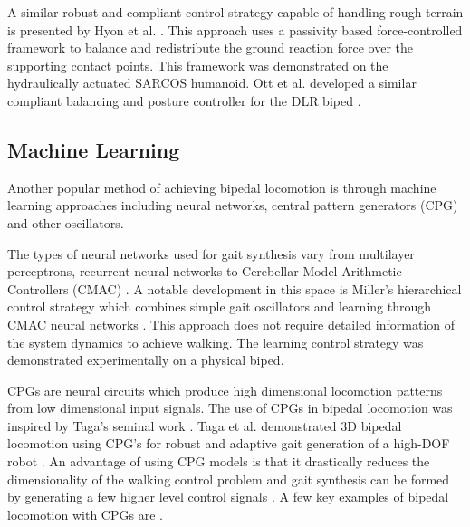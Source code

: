 A similar robust and compliant control strategy capable of handling rough terrain is presented by Hyon et al. \cite{Hyon2007}. This approach uses a passivity based force-controlled framework to balance and redistribute the ground reaction force over the supporting contact points. This framework was demonstrated on the hydraulically actuated SARCOS humanoid. Ott et al. developed a similar compliant balancing and posture controller for the DLR biped \cite{Ott:2010jz}.



\subsection{Machine Learning} %
\label{sub:related_machine_learning}
Another popular method of achieving bipedal locomotion is through machine learning approaches including neural networks, central pattern generators (CPG) and other oscillators. 

The types of neural networks used for gait synthesis vary from multilayer perceptrons, recurrent neural networks to Cerebellar Model Arithmetic Controllers (CMAC) \cite{Katic2003}. A notable development in this space is Miller's hierarchical control strategy which combines simple gait oscillators and learning through CMAC neural networks \cite{Miller1994,Kun1996}. This approach does not require detailed information of the system dynamics to achieve walking. The learning control strategy was demonstrated experimentally on a physical biped.  

CPGs are neural circuits which produce high dimensional locomotion patterns from low dimensional input signals. The use of CPGs in bipedal locomotion was inspired by Taga's seminal work \cite{Taga1991,Taga1998}. Taga et al. demonstrated 3D bipedal locomotion using CPG's for robust and adaptive gait generation of a high-DOF robot \cite{Miyakoshi1998}. An advantage of using CPG models is that it drastically reduces the dimensionality of the walking control problem and gait synthesis can be formed by generating a few higher level control signals \cite{Ijspreet2008}. A few key examples of bipedal locomotion with CPGs are \cite{Morimoto2006,Righetti2006,Aoi2005}.


